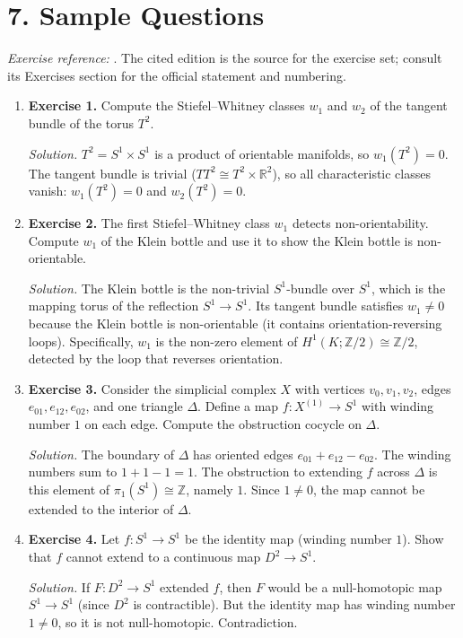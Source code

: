 \section*{7. Sample Questions}
\emph{Exercise reference:} \cite{obstruction_theory_ref1}. The cited edition is the source for the exercise set; consult its Exercises section for the official statement and numbering.
\begin{enumerate}[leftmargin=*,itemsep=0.9em]
\item \textbf{Exercise 1.} Compute the Stiefel--Whitney classes $w_1$ and $w_2$ of the tangent bundle of the torus $T^2$.

\emph{Solution.} $T^2=S^1\times S^1$ is a product of orientable manifolds, so $w_1(T^2)=0$. The tangent bundle is trivial ($TT^2\cong T^2\times\mathbb{R}^2$), so all characteristic classes vanish: $w_1(T^2)=0$ and $w_2(T^2)=0$.

\item \textbf{Exercise 2.} The first Stiefel--Whitney class $w_1$ detects non-orientability. Compute $w_1$ of the Klein bottle and use it to show the Klein bottle is non-orientable.

\emph{Solution.} The Klein bottle is the non-trivial $S^1$-bundle over $S^1$, which is the mapping torus of the reflection $S^1\to S^1$. Its tangent bundle satisfies $w_1\neq 0$ because the Klein bottle is non-orientable (it contains orientation-reversing loops). Specifically, $w_1$ is the non-zero element of $H^1(K;\mathbb{Z}/2)\cong\mathbb{Z}/2$, detected by the loop that reverses orientation.

\item \textbf{Exercise 3.} Consider the simplicial complex $X$ with vertices $v_0,v_1,v_2$, edges $e_{01},e_{12},e_{02}$, and one triangle $\Delta$. Define a map $f\colon X^{(1)}\to S^1$ with winding number $1$ on each edge. Compute the obstruction cocycle on $\Delta$.

\emph{Solution.} The boundary of $\Delta$ has oriented edges $e_{01}+e_{12}-e_{02}$. The winding numbers sum to $1+1-1=1$. The obstruction to extending $f$ across $\Delta$ is this element of $\pi_1(S^1)\cong\mathbb{Z}$, namely $1$. Since $1\neq 0$, the map cannot be extended to the interior of $\Delta$.

\item \textbf{Exercise 4.} Let $f\colon S^1\to S^1$ be the identity map (winding number $1$). Show that $f$ cannot extend to a continuous map $D^2\to S^1$.

\emph{Solution.} If $F\colon D^2\to S^1$ extended $f$, then $F$ would be a null-homotopic map $S^1\to S^1$ (since $D^2$ is contractible). But the identity map has winding number $1\neq 0$, so it is not null-homotopic. Contradiction.


\end{enumerate}
